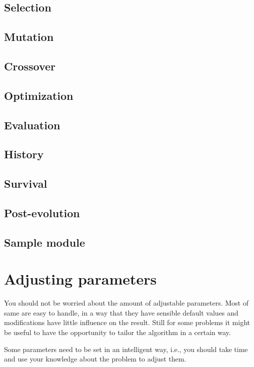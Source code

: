 \subsection{Selection}           
\subsection{Mutation}            
\subsection{Crossover}           
\subsection{Optimization}         
\subsection{Evaluation}           
\subsection{History}           
\subsection{Survival}        
\subsection{Post-evolution}       
\subsection{Sample module}      


\section{Adjusting parameters  \label{parameter}}

You should not be worried about the amount of adjustable parameters.
Most of same are easy to handle, in a way that they have sensible
default values and modifications have little influence on the result.
Still for some problems it might be useful to have the opportunity to
tailor the algorithm in a certain way.

Some parameters need to be set in an intelligent way, i.e., you should
take time and use your knowledge about the problem to adjust them.

